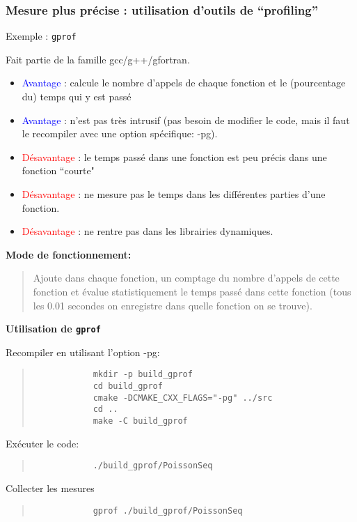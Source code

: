 \documentclass{beamer}
\begin{document}
\begin{frame}
	\frametitle{Mesure plus pr\'ecise : utilisation d'outils de ``profiling''}
    
    Exemple : {\tt gprof}
    
	\vfill
	Fait partie de la famille gcc/g++/gfortran.
	
	
	\begin{itemize}
	\item \textcolor{blue}{Avantage} : calcule le nombre d'appels de chaque fonction et le (pourcentage du) temps qui y est pass\'e
	\item \textcolor{blue}{Avantage} : n'est pas tr\`es intrusif (pas besoin de modifier le code, mais il faut le recompiler avec une option sp\'ecifique: -pg).
	\item \textcolor{red}{D\'esavantage} : le temps pass\'e dans une fonction est peu pr\'ecis dans une fonction ``courte"
	\item \textcolor{red}{D\'esavantage} : ne mesure pas le temps dans les diff\'erentes parties d'une fonction.
	\item \textcolor{red}{D\'esavantage} : ne rentre pas dans les librairies dynamiques.
\end{itemize}
	\vfill
\end{frame}
\begin{frame}[fragile]
	
{\bf 	Mode de fonctionnement:}
	\begin{quote}
		Ajoute dans chaque fonction, un comptage du nombre d'appels de cette fonction et \'evalue statistiquement le temps pass\'e dans cette fonction (tous les 0.01 secondes on enregistre dans quelle fonction on se trouve).
	\end{quote} 

	\vfill
{\bf Utilisation de {\tt gprof}}
	\vfill

Recompiler en utilisant l'option -pg:
	\begin{quote}
		\begin{verbatim}
			mkdir -p build_gprof
			cd build_gprof
			cmake -DCMAKE_CXX_FLAGS="-pg" ../src
			cd ..
			make -C build_gprof
		\end{verbatim}
	\end{quote} 

Exécuter le code:
		\begin{quote}
		\begin{verbatim}
			./build_gprof/PoissonSeq
		\end{verbatim}
		\end{quote}
	
Collecter les mesures
		\begin{quote}
		\begin{verbatim}
			gprof ./build_gprof/PoissonSeq
		\end{verbatim}
		\end{quote}

\end{frame}
\end{document}
